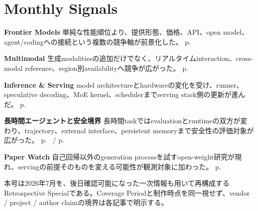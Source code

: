 \section*{Monthly Signals}
\smallskip
\noindent \textbf{Frontier Models} 単純な性能順位より、提供形態、価格、API、open model、agent/codingへの接続という複数の競争軸が前景化した。 \hfill{\footnotesize p.~\pageref{pkg:frontier-models-july}}
\par
\smallskip
\noindent \textbf{Multimodal} 生成modalitiesの追加だけでなく、リアルタイムinteraction、cross-modal reference、region別availabilityへ競争が広がった。 \hfill{\footnotesize p.~\pageref{pkg:multimodal-july}}
\par
\smallskip
\noindent \textbf{Inference \& Serving} model architectureとhardwareの変化を受け、runner、speculative decoding、MoE kernel、schedulerまでserving stack側の更新が進んだ。 \hfill{\footnotesize p.~\pageref{pkg:inference-serving-july}}
\par
\smallskip
\noindent \textbf{長時間エージェントと安全境界} 長時間taskではevaluationとruntimeの双方が変わり、trajectory、external interface、persistent memoryまで安全性の評価対象が広がった。 \hfill{\footnotesize p.~\pageref{pkg:agents-july} / p.~\pageref{pkg:agent-safety-security-july}}
\par
\smallskip
\noindent \textbf{Paper Watch} 自己回帰以外のgeneration processを試すopen-weight研究が現れ、servingの前提そのものを変える可能性が観測対象に加わった。 \hfill{\footnotesize p.~\pageref{pkg:paper-watch-july}}
\par
\medskip
\begin{claimboundary}
本号は2026年7月を、後日確認可能になった一次情報も用いて再構成するRetrospective Specialである。Coverage Periodと制作時点を同一視せず、vendor / project / author claimの境界は各記事で明示する。
\end{claimboundary}
\medskip
\tableofcontents
